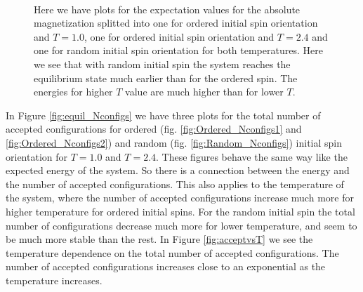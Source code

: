 \documentclass[12pt,a4paper,english]{article}
\begin{document}
\begin{figure}[htbp]
	\hspace{0.5em}
	\\
	\caption{Here we have plots for the expectation values for the absolute magnetization splitted into one for ordered initial spin orientation and $T=1.0$, one for ordered initial spin orientation and $T=2.4$ and one for random initial spin orientation for both temperatures. Here we see that with random initial spin the system reaches the equilibrium state much earlier than for the ordered spin. The energies for higher $T$ value are much higher than for lower $T$.\label{fig:equil_M}}
\end{figure}

In Figure \ref{fig:equil_Nconfigs} we have three plots for the total number of accepted configurations for ordered (fig. \ref{fig:Ordered_Nconfigs1} and \ref{fig:Ordered_Nconfigs2}) and random (fig. \ref{fig:Random_Nconfigs}) initial spin orientation for $T=1.0$ and $T=2.4$. These figures behave the same way like the expected energy of the system. So there is a connection between the energy and the number of accepted configurations. This also applies to the temperature of the system, where the number of accepted configurations increase much more for higher temperature for ordered initial spins. For the random initial spin the total number of configurations decrease much more for lower temperature, and seem to be much more stable than the rest. In Figure \ref{fig:acceptvsT} we see the temperature dependence on the total number of accepted configurations. The number of accepted configurations increases close to an exponential as the temperature increases.
\end{document}
